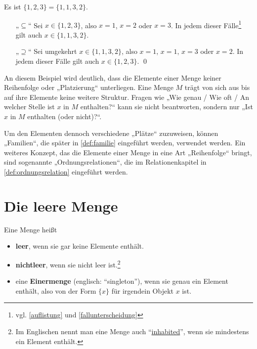 \begin{bsp}[*] \label{bsp:mengengleichbeweis}
    Es ist $\{1,2,3\}=\{1,1,3,2\}$.
\end{bsp}


\begin{bew}
    \begin{itemize}
        \item[„$\subseteq$“] Sei $x\in\{1,2,3\}$, also $x=1$, $x=2$ oder $x=3$. In jedem dieser Fälle\footnote{vgl. \cref{auflistung} und \cref{fallunterscheidung}} gilt auch $x\in\{1,1,3,2\}$.
        \item[„$\supseteq$“] Sei umgekehrt $x\in\{1,1,3,2\}$,  also $x=1$, $x=1$, $x=3$ oder $x=2$. In jedem dieser Fälle gilt auch $x\in\{1,2,3\}$. \qed
    \end{itemize}
\end{bew}


\begin{bem} \label{mengenstrukturlos}
    An diesem Beispiel wird deutlich, dass die Elemente einer Menge keiner Reihenfolge oder „Platzierung“ unterliegen. Eine Menge $M$ trägt von sich aus bis auf ihre Elemente keine weitere Struktur. Fragen wie „Wie genau / Wie oft / An welcher Stelle ist $x$ in $M$ enthalten?“ kann sie nicht beantworten, sondern nur „Ist $x$ in $M$ enthalten (oder nicht)?“.
    
    Um den Elementen dennoch verschiedene „Plätze“ zuzuweisen, können „Familien“, die später in \cref{def:familie} eingeführt werden, verwendet werden. Ein weiteres Konzept, das die Elemente einer Menge in eine Art „Reihenfolge“ bringt, sind sogenannte „Ordnungsrelationen“, die im Relationenkapitel in \cref{def:ordnungsrelation} eingeführt werden.
\end{bem}





\section{Die leere Menge}


\begin{de}  
    Eine Menge heißt
    \begin{itemize}
        \item \textbf{leer}, wenn sie gar keine Elemente enthält.
        \item \textbf{nichtleer}, wenn sie nicht leer ist.\footnote{Im Englischen nennt man eine Menge auch ``\href{https://en.wikipedia.org/wiki/Inhabited_set}{inhabited}'', wenn sie mindestens ein Element enthält.}
        \item eine \textbf{Einermenge} (englisch: ``singleton''), wenn sie genau ein Element enthält, also von der Form $\{x\}$ für irgendein Objekt $x$ ist.
    \end{itemize}
\end{de}


